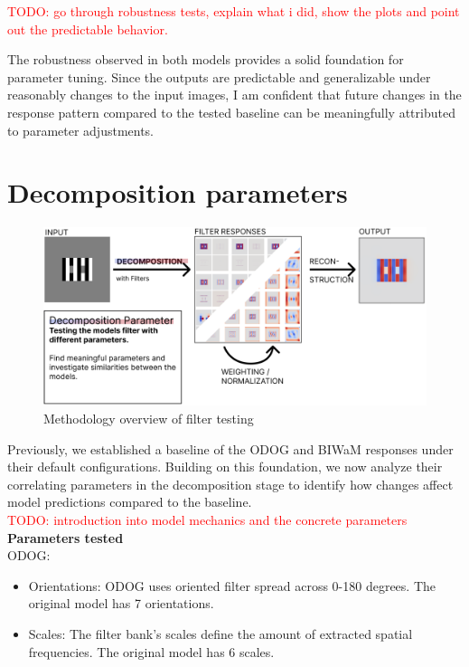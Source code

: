 \textcolor{red}{TODO: go through robustness tests, explain what i did, show the plots and
point out the predictable behavior.}

The robustness observed in both models provides a solid foundation for parameter tuning.
Since the outputs are predictable and generalizable under reasonably changes to the input
images, I am confident that future changes in the response pattern compared to the tested
baseline can be meaningfully attributed to parameter adjustments.

\newpage
\section{Decomposition parameters}

\begin{figure}[H]
    \centering
    \includegraphics[width=\linewidth]{media/methodology/decomposition_overview.png}
    \begin{minipage}{0.8\textwidth}
    \caption{Methodology overview of filter testing}
    \label{fig:figure11}
    \end{minipage}
\end{figure}
Previously, we established a baseline of the ODOG and BIWaM responses under their default
configurations. Building on this foundation, we now analyze their correlating parameters
in the decomposition stage to identify how changes affect model predictions compared to
the baseline.\\
\textcolor{red}{TODO: introduction into model mechanics and the concrete parameters}
\textbf{Parameters tested} \\
ODOG:
\begin{itemize} 
    \item Orientations: ODOG uses oriented filter spread across 0-180 degrees.
    The original model has 7 orientations.
    \item Scales: The filter bank’s scales define the amount of extracted
    spatial frequencies. The original model has 6 scales.
\end{itemize}

